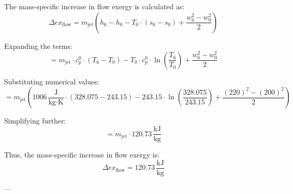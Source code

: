 The mass-specific increase in flow exergy is calculated as:  
\[
\Delta ex_{\text{flow}} = m_{\text{jet}} \left( h_6 - h_0 - T_0 \cdot (s_6 - s_0) + \frac{w_6^2 - w_0^2}{2} \right)
\]  

Expanding the terms:  
\[
= m_{\text{jet}} \cdot c_p^0 \cdot (T_6 - T_0) - T_0 \cdot c_p^0 \cdot \ln \left( \frac{T_6}{T_0} \right) + \frac{w_6^2 - w_0^2}{2}
\]  

Substituting numerical values:  
\[
= m_{\text{jet}} \left( 1006 \, \frac{\text{J}}{\text{kg·K}} \cdot (328.075 - 243.15) - 243.15 \cdot \ln \left( \frac{328.075}{243.15} \right) + \frac{(220)^2 - (200)^2}{2} \right)
\]  

Simplifying further:  
\[
= m_{\text{jet}} \cdot 120.73 \, \frac{\text{kJ}}{\text{kg}}
\]  

Thus, the mass-specific increase in flow exergy is:  
\[
\Delta ex_{\text{flow}} = 120.73 \, \frac{\text{kJ}}{\text{kg}}
\]  

---